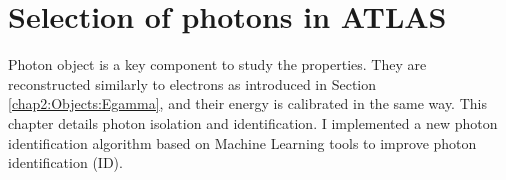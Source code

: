 \newpage
\chapter{Selection of photons in ATLAS}
\label{gamma}
Photon object is a key component to study the \HHyybb properties. They are reconstructed similarly to electrons as introduced in Section \ref{chap2:Objects:Egamma}, and their energy is calibrated in the same way. This chapter details photon isolation and identification. I implemented a new photon identification algorithm based on Machine Learning tools to improve photon identification (ID).

